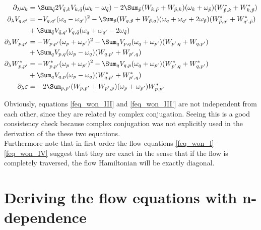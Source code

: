 \begin{appendix}
\begin{flushleft}
\begin{subequations}
\begin{align}
\partial_\lambda\omega_k&= \Sum_{\tilde q}2V_{\tilde q,k}V_{k,\tilde q}(\omega_k-\omega_{\tilde q})-2\Sum_{\tilde p}(W_{k,\tilde p}+W_{\tilde p,k})(\omega_k+\omega_{\tilde p})(W_{\tilde p, k}^*+W_{k,\tilde p}^*)\label{feq_won_I}\\ 
\partial_\lambda V_{q,q^\prime}&=-V_{q,q^\prime}(\omega_q-\omega_{q^\prime})^2-\Sum_{\tilde p}(W_{q,\tilde p}+W_{\tilde p,q})(\omega_q+\omega_{ q^\prime}+2\omega_{\tilde p})(W_{\tilde p, q^\prime}^*+W_{q^\prime,\tilde p}^*) \nonumber\\ \quad&
+ \Sum_{\tilde q}V_{\tilde q,q^\prime}V_{q,\tilde q}(\omega_q+\omega_{q^\prime}-2\omega_{\tilde q}) %
\label{feq_won_II} \\ 
\partial_\lambda W_{p,p^\prime}&=-W_{p,p^\prime}(\omega_p+\omega_{p^\prime})^2-\Sum_{ q}V_{ p, q}(\omega_q+\omega_{p^\prime})(W_{p^\prime,q}+W_{q,p^\prime}) \nonumber\\ \quad&
+ \Sum_{q}V_{{p},q}(\omega_{p}-\omega_{q}) (W_{ q, p^\prime}+W_{ p^\prime, q})\label{feq_won_III}\\ 
\partial_\lambda W_{p,p^\prime}^*&=-W_{p,p^\prime}^*(\omega_p+\omega_{p^\prime})^2-\Sum_{ q}V_{ q, p}(\omega_{q}+\omega_{p^\prime})(W_{p^\prime,q}^*+W_{q,p^\prime}^*)\nonumber\\ \quad& 
+\Sum_{q}V_{q,p}(\omega_{p}-\omega_{q}) (W_{ q, p^\prime}^*+W_{ p^\prime, {q}}^*)\label{feq_won_III'}\\ 
\partial_\lambda \varepsilon&=-2\Sum_{p,p^\prime}(W_{p,p^\prime}+W_{p^\prime,p})(\omega_p+\omega_{p^\prime})W_{p,p^\prime}^*\label{feq_won_IV}
\end{align}
\end{subequations}
\end{flushleft}
Obviously, equations \ref{feq_won_III} and \ref{feq_won_III'} are not independent from each other, since they are related by complex conjugation. Seeing this is a good consistency check because complex conjugation was not explicitly used in the derivation of the these two equations.\\
Furthermore note that in first order the flow equations \ref{feq_won_I}-\ref{feq_won_IV} suggest that they are exact in the sense that if the flow is completely traversed, the flow Hamiltonian will be exactly diagonal.

\section{Deriving the flow equations with n-dependence}

\end{appendix}

